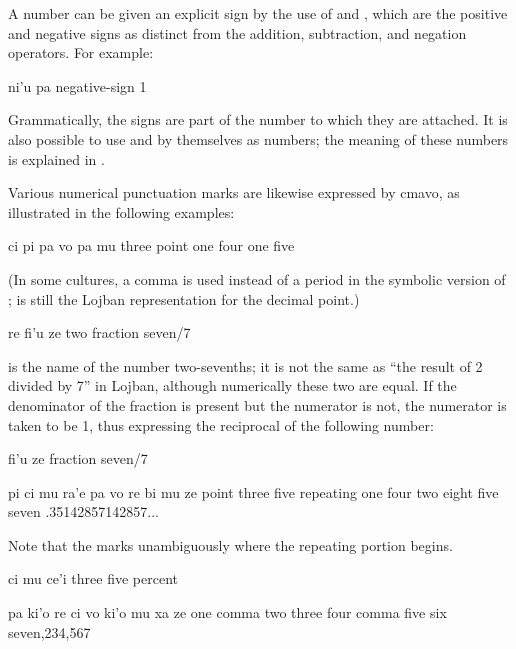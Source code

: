 A number can be given an explicit sign by the use of 
    and , which are the positive and negative signs as
    distinct from the addition, subtraction, and negation
    operators. For example:
\begin{example}
ni'u pa\n
negative-sign 1
\end{example}

Grammatically, the signs are part of the number to which they
    are attached. It is also possible to use  and 
    by themselves as numbers; the meaning of these numbers is
    explained in . 

Various numerical punctuation marks are likewise expressed
    by cmavo, as illustrated in the following examples:
\begin{example}
ci pi pa vo pa mu\n
three point one four one five
\end{example}

(In some cultures, a comma is used instead of a period in the
    symbolic version of ;  is
    still the Lojban representation for the decimal point.)
\begin{example}
re fi'u ze\n
two fraction seven/7
\end{example}

 is the name of the number
    two-sevenths; it is not the same as ``the result of 2 divided
    by 7'' in Lojban, although numerically these two are equal. If
    the denominator of the fraction is present but the numerator is
    not, the numerator is taken to be 1, thus expressing the
    reciprocal of the following number:
\begin{example}
fi'u ze\n
fraction seven/7
\end{example}

\begin{example}
pi ci mu ra'e pa vo re bi mu ze\n
point three five repeating one four two eight five seven\n
.35142857142857...
\end{example}

Note that the  marks unambiguously where the repeating
    portion  begins.
\begin{example}
ci mu ce'i\n
three five percent%
\end{example}

\begin{example}
pa ki'o re ci vo ki'o mu xa ze\n
one comma two three four comma five six seven,234,567
\end{example}

